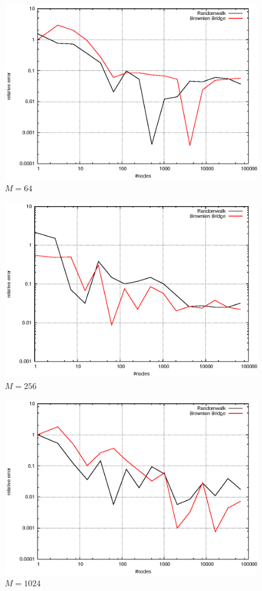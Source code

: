 \documentclass[]{article}
\begin{document}
\begin{figure}[!ht]
\centering
\includegraphics[width=.9\textwidth]{task4_mc_64.eps}
\caption{$M=64$}
\label{fig:Task4b}
\end{figure}

\begin{figure}[!ht]
\centering
\includegraphics[width=.9\textwidth]{task4_mc_256.eps}
\caption{$M=256$}
\label{fig:Task4c}
\end{figure}

\begin{figure}[!ht]
\centering
\includegraphics[width=.9\textwidth]{task4_mc_1024.eps}
\caption{$M=1024$}
\label{fig:Task4d}
\end{figure}
\end{document}
